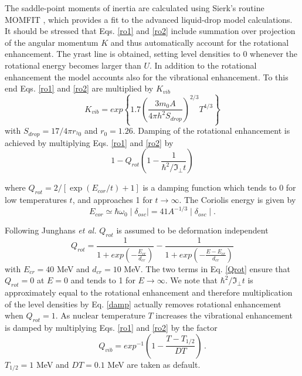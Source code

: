 \documentclass[twocolumn,amsmath,amssymb,10pt,groupedaddress,a4paper]{revtex4}
\begin{document}
The saddle-point moments of inertia are calculated using Sierk's routine
MOMFIT \cite{sierk}, which provides a fit to the advanced liquid-drop
model calculations.
It should be stressed that Eqs. \ref{ro1} and \ref{ro2} include
summation over projection of the angular momentum $K$ and thus automatically
account for the rotational enhancement. The yrast line is obtained,
setting level densities to 0 whenever the
rotational energy becomes larger than $U$. In addition to the rotational
enhancement the model accounts also for the vibrational enhancement.
To this end Eqs. \ref{ro1} and
\ref{ro2} are multiplied by $K_{vib}$
\begin{equation}
K_{vib}=exp\left\{ 1.7\left(\frac{3m_{0}A}{4\pi h^{2}S_{drop}}\right)^{2/3}T^{4/3}\right\} \label{Kvib}
\end{equation}
with $S_{drop}=17/4\pi r_{^{2}0}$ and $r_{0}=1.26$.
Damping of the rotational enhancement is achieved by multiplying Eqs.
\ref{ro1} and \ref{ro2} by
\begin{equation}
1-Q_{rot}\left(1-\frac{1}{\hbar^{2}/\Im_{\bot}t}\right)\label{damp}
\end{equation}

\noindent where $Q_{rot}=2/\left[\exp(E_{cor}/t)+1\right]$ is a damping function
which tends to 0 for low temperatures $t$, and approaches 1 for $t\rightarrow\infty$.
The Coriolis energy is given by
\begin{equation}
E_{cor}\simeq\hbar\omega_{0}\mid\delta_{osc}\mid=41A^{-1/3}\mid\delta_{osc}\mid.\label{Coriolis}
\end{equation}


\noindent Following Junghans \emph{et al.} \cite{Ignadamp} $Q_{rot}$
is assumed to be deformation independent
\begin{equation}
Q_{rot}=\frac{1}{1+exp\left(-\frac{E_{cr}}{d_{cr}}\right)}-\frac{1}{1+exp\left(-\frac{E-E_{cr}}{d_{cr}}\right)}\label{Qrot}
\end{equation}
 \noindent with $E_{cr}=40$ MeV and $d_{cr}=10$ MeV. The two terms
in Eq. \ref{Qrot} ensure that $Q_{rot}=0$ at $E=0$ and tends to
1 for $E\rightarrow\infty$. We note that $\hbar^{2}/\Im_{\bot}t$
is approximately equal to the rotational enhancement and therefore
multiplication of the level densities by Eq.
\ref{damp} actually removes rotational enhancement when $Q_{rot}=1$.
As nuclear temperature $T$ increases the vibrational enhancement
is damped by multiplying Eqs. \ref{ro1} and \ref{ro2} by the factor
\begin{equation}
Q_{vib}=exp^{-1}\left(1-\frac{T-T_{1/2}}{DT}\right)\,.\label{Qvib}
\end{equation}
 $T_{1/2}=1$ MeV and $DT=0.1$ MeV are taken as default.
\end{document}
